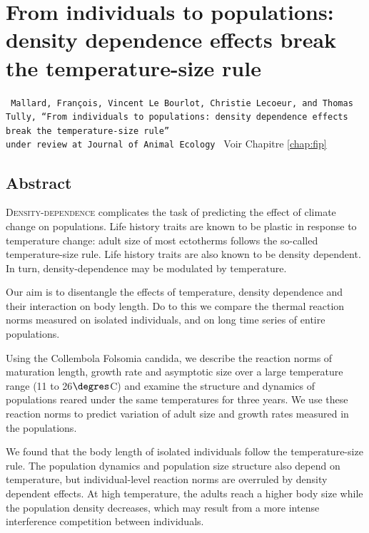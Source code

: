 \chapter{From
individuals to populations:
density dependence effects break the temperature-size rule}
\label{Ann:fip}

\vspace{2cm}
\begin{Spacing}{1}
\texttt{
Mallard, François, Vincent Le Bourlot, Christie Lecoeur, and Thomas Tully, ``From
individuals to populations:
density dependence effects break the temperature-size rule''\\
under review at Journal of Animal Ecology
}
Voir Chapitre \ref{chap:fip}
\end{Spacing}

\section*{Abstract}

\lettrine[lines=3]{D}{ensity-dependence} complicates the task of predicting the
effect of climate change on populations. Life history traits are known to be
plastic in response to temperature change: adult size of most ectotherms follows
the so-called temperature-size rule. Life history traits are also known to be
density dependent. In turn, density-dependence may be modulated by temperature.

Our aim is to disentangle the effects of temperature, density dependence and
their interaction on body length. Do to this we compare the thermal reaction
norms measured on isolated individuals, and on long time series of entire
populations.

Using the Collembola Folsomia candida, we describe the reaction norms of
maturation length, growth rate and asymptotic size over a large temperature
range (11 to 26$\degres$C) and examine the structure and dynamics of populations
reared under the same temperatures for three years. We use these reaction norms to
predict variation of adult size and growth rates measured in the populations.

We found that the body length of isolated individuals follow the
temperature-size rule. The population dynamics and population size structure
also depend on temperature, but individual-level reaction norms are overruled by
density dependent effects. At high temperature, the adults reach a higher body
size while the population density decreases, which may result from a more
intense interference competition between individuals.

